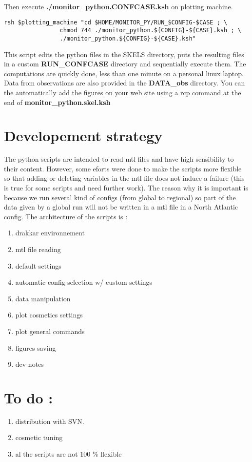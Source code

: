 \documentclass[a4paper,11pt]{article}
\begin{document}
\noindent
Then execute \textbf{./monitor\_python.CONFCASE.ksh} on plotting machine.
\begin{verbatim}
rsh $plotting_machine "cd $HOME/MONITOR_PY/RUN_$CONFIG-$CASE ; \
                chmod 744 ./monitor_python.${CONFIG}-${CASE}.ksh ; \
                ./monitor_python.${CONFIG}-${CASE}.ksh"
\end{verbatim}

\noindent
This script edits the python files in the SKELS directory, puts the resulting files in a custom \textbf{RUN\_CONFCASE} directory and sequentially execute them.
The computations are quickly done, less than one minute on a personal linux laptop.
Data from observations are also provided in the \textbf{DATA\_obs} directory. You can the automatically add the figures on your web site using a rcp command at the end of \textbf{monitor\_python.skel.ksh}
 


\section{Developement strategy}

The python scripts are intended to read mtl files and have high sensibility to their content. However, some eforts were done to make
the scripts more flexible so that adding or deleting variables in the mtl file does not induce a failure (this is true for some scripts and need further work).
The reason why it is important is because we run several kind of configs (from global to regional) so part of the data given by a global run will not be written
in a mtl file in a North Atlantic config. The architecture of the scripts is :

\begin{enumerate}
\item drakkar environnement
\item mtl file reading
\item default settings 
\item automatic config selection w/ custom settings
\item data manipulation
\item plot cosmetics settings
\item plot general commands
\item figures saving
\item dev notes

\end{enumerate}

\section{To do :}

\begin{enumerate}
\item distribution with SVN.
\item cosmetic tuning
\item al the scripts are not 100 \% flexible
\end{enumerate}
\end{document}
